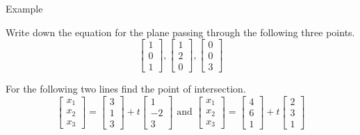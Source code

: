 \documentclass{beamer}
\begin{document}
\begin{frame}{Example}
  \begin{example}
    Write down the equation for the plane passing through the following three points.
    \begin{equation*}
      \left[
	\begin{array}{c}
          1\\
          0\\
          1
	\end{array}
      \right], \left[
	\begin{array}{c}
          1\\
          2\\
          0
	\end{array}
      \right], \left[
	\begin{array}{c}
          0\\
          0\\
          3
	\end{array}
      \right]
    \end{equation*}
  \end{example}
  \begin{example}
    For the following two lines find the point of intersection.
    \begin{equation*}
      \left[
	\begin{array}{c}
          x_1\\
          x_2\\
          x_3
	\end{array}
      \right] = \left[
	\begin{array}{c}
          3\\
          1\\
          3
	\end{array}
      \right]+ t \left[
	\begin{array}{c}
          1\\
          -2\\
          3
	\end{array}
      \right]\text{ and }
      \left[
	\begin{array}{c}
          x_1\\
          x_2\\
          x_3
	\end{array}
      \right] = \left[
	\begin{array}{c}
          4\\
          6\\
          1
	\end{array}
      \right]+ t \left[
	\begin{array}{c}
          2\\
          3\\
          1
	\end{array}
      \right]
    \end{equation*}
  \end{example}
\end{frame}
\end{document}

